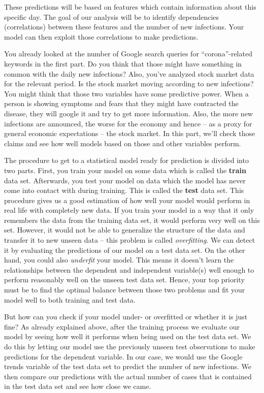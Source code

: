 \documentclass[
  11pt,
]{article}
\begin{document}
These predictions will be based on features which contain information about this specific day. The goal of our analysis will be to identify dependencies (correlations) between these features and the number of new infections. Your model can then exploit those correlations to make predictions.

You already looked at the number of Google search queries for ``corona''-related keywords in the first part. Do you think that those might have something in common with the daily new infections? Also, you've analyzed stock market data for the relevant period. Is the stock market moving according to new infections? You might think that those two variables have some predictive power. When a person is showing symptoms and fears that they might have contracted the disease, they will google it and try to get more information. Also, the more new infections are announced, the worse for the economy and hence -- as a proxy for general economic expectations -- the stock market. In this part, we'll check those claims and see how well models based on those and other variables perform.

The procedure to get to a statistical model ready for prediction is divided into two parts. First, you train your model on some data which is called the \textbf{train} data set. Afterwards, you test your model on data which the model has never come into contact with during training. This is called the \textbf{test} data set.
This procedure gives us a good estimation of how well your model would perform in real life with completely new data.
If you train your model in a way that it only remembers the data from the training data set, it would perform very well on this set. However, it would not be able to generalize the structure of the data and transfer it to new unseen data -- this problem is called \emph{overfitting}. We can detect it by evaluating the predictions of our model on a test data set. On the other hand, you could also \emph{underfit} your model. This means it doesn't learn the relationships between the dependent and independent variable(s) well enough to perform reasonably well on the unseen test data set. Hence, your top priority must be to find the optimal balance between those two problems and fit your model well to both training and test data.

But how can you check if your model under- or overfitted or whether it is just fine? As already explained above, after the training process we evaluate our model by seeing how well it performs when being used on the test data set. We do this by letting our model use the previously unseen test observations to make predictions for the dependent variable. In our case, we would use the Google trends variable of the test data set to predict the number of new infections. We then compare our predictions with the actual number of cases that is contained in the test data set and see how close we came.
\end{document}
